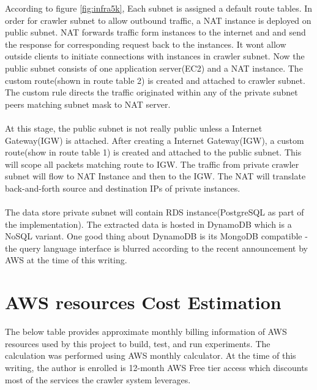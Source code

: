 \noindent
According to figure \ref{fig:infra5k}, Each subnet is assigned a default route tables. In order for crawler
subnet to allow outbound traffic, a NAT instance is deployed on public subnet. NAT forwards traffic form instances to the internet and and send the response for corresponding request back to the instances.
It wont allow outside clients to initiate connections with instances in crawler subnet. Now the public subnet consists of one application server(EC2) and a NAT instance. The custom route(shown in route table 2)  is created and attached to crawler subnet. The custom rule directs the traffic originated within any of the private subnet peers matching subnet mask  to NAT server.
\\
\\
At this stage, the public subnet is not really public unless a Internet Gateway(IGW) is attached. After creating a Internet Gateway(IGW), a custom route(show in route table 1) is created and attached to the public subnet. This will scope all packets matching  route to IGW. The traffic from private
crawler subnet will flow to NAT Instance and then to the IGW. The NAT will translate back-and-forth source
and destination IPs of private instances.
\\
\\
The data store private subnet will contain RDS instance(PostgreSQL as part of the implementation). The
extracted data is hosted in DynamoDB which is a NoSQL variant. One good thing about DynamoDB is its
MongoDB compatible - the query language interface is blurred according to the recent announcement by AWS at
the time of this writing.

\section{AWS resources Cost Estimation}
The below table provides approximate monthly billing information of AWS resources used by this project to build, test, and run experiments. The calculation was performed using AWS monthly calculator. At the time of
this writing, the author is enrolled is 12-month AWS Free tier access which discounts most of the services
the crawler system leverages.


